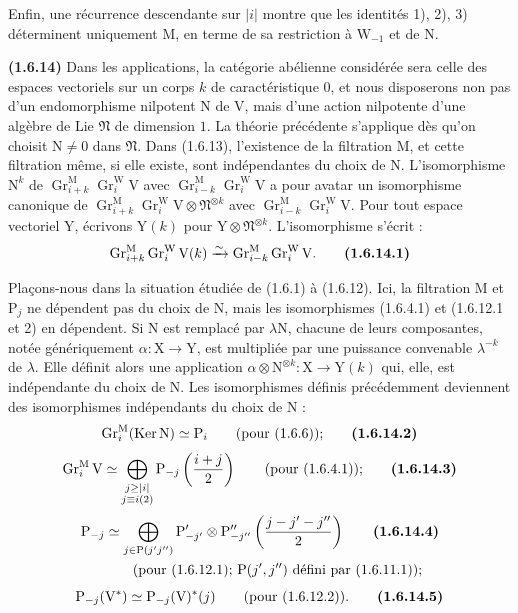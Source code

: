 \documentclass[11pt,leqno]{article}
\newcommand{\Page}[1]{\ifvmode\noindent\else\unskip\ \fi{\footnotesize\textcolor{gray}{[p.\,#1]}}\ \ignorespaces}
\begin{document}
Enfin, une récurrence descendante sur \(|i|\) montre que les identités 1), 2), 3) déterminent uniquement \(\mathrm{M}\), en terme de sa restriction à \(\mathrm{W}_{-1}\) et de \(\mathrm{N}\).

\textbf{(1.6.14)} Dans les applications, la catégorie abélienne considérée sera celle des espaces vectoriels sur un corps \(k\) de caractéristique \(0\), et nous disposerons non pas d’un endomorphisme nilpotent \(\mathrm{N}\) de \(\mathrm{V}\), mais d’une action nilpotente d’une algèbre de Lie \(\mathfrak{N}\) de dimension \(1\). La théorie précédente s’applique dès qu’on choisit \(\mathrm{N}\neq0\) dans \(\mathfrak{N}\). Dans (1.6.13), l’existence de la filtration \(\mathrm{M}\), et cette filtration même, si elle existe, sont indépendantes du choix de \(\mathrm{N}\). L’isomorphisme \(\mathrm{N}^k\) de \(\operatorname{Gr}_{i+k}^{\mathrm{M}}\operatorname{Gr}_i^{\mathrm{W}}\mathrm{V}\) avec \(\operatorname{Gr}_{i-k}^{\mathrm{M}}\operatorname{Gr}_i^{\mathrm{W}}\mathrm{V}\) a pour avatar un isomorphisme canonique de \(\operatorname{Gr}_{i+k}^{\mathrm{M}}\operatorname{Gr}_i^{\mathrm{W}}\mathrm{V}\otimes\mathfrak{N}^{\otimes k}\) avec \(\operatorname{Gr}_{i-k}^{\mathrm{M}}\operatorname{Gr}_i^{\mathrm{W}}\mathrm{V}\). Pour tout espace vectoriel \(\mathrm{Y}\), écrivons \(\mathrm{Y}(k)\) pour \(\mathrm{Y}\otimes\mathfrak{N}^{\otimes k}\). L’isomorphisme s’écrit :
\[
\operatorname{Gr}_{i+k}^{\mathrm{M}}\operatorname{Gr}_i^{\mathrm{W}}\mathrm{V}(k)
\xrightarrow{\sim}
\operatorname{Gr}_{i-k}^{\mathrm{M}}\operatorname{Gr}_i^{\mathrm{W}}\mathrm{V}.
\tag*{\textbf{(1.6.14.1)}}
\]

Plaçons-nous dans la situation étudiée de (1.6.1) à (1.6.12). Ici, la filtration \(\mathrm{M}\) et \(\mathrm{P}_j\) ne dépendent pas du choix de \(\mathrm{N}\), mais les isomorphismes (1.6.4.1) et (1.6.12.1 et 2) en dépendent. Si \(\mathrm{N}\) est remplacé par \(\lambda\mathrm{N}\), chacune de leurs composantes, notée génériquement \(\alpha:\mathrm{X}\to\mathrm{Y}\), est multipliée par une puissance convenable \(\lambda^{-k}\) de \(\lambda\). Elle définit alors une application \(\alpha\otimes\mathrm{N}^{\otimes k}:\mathrm{X}\to\mathrm{Y}(k)\) qui, elle, est indépendante du choix de \(\mathrm{N}\). Les isomorphismes définis précédemment deviennent des isomorphismes indépendants du choix de \(\mathrm{N}\) :
\Page{170}
\[
\operatorname{Gr}_i^{\mathrm{M}}(\operatorname{Ker}\mathrm{N})
\simeq\mathrm{P}_i
\qquad\text{(pour (1.6.6));}
\tag*{\textbf{(1.6.14.2)}}
\]
\[
\operatorname{Gr}_i^{\mathrm{M}}\mathrm{V}
\simeq
\bigoplus_{\substack{j\geq|i|\\j\equiv i(2)}}
\mathrm{P}_{-j}\left(\frac{i+j}{2}\right)
\qquad\text{(pour (1.6.4.1));}
\tag*{\textbf{(1.6.14.3)}}
\]
\begin{align*}
\mathrm{P}_{-j}
&\simeq
\bigoplus_{j\in\mathrm{P}(j'j'')}
\mathrm{P}'_{-j'}\otimes\mathrm{P}''_{-j''}
\left(\frac{j-j'-j''}{2}\right)
\tag*{\textbf{(1.6.14.4)}}\\
&\qquad\text{(pour (1.6.12.1); }\mathrm{P}(j',j'')
\text{ défini par (1.6.11.1));}
\end{align*}
\[
\mathrm{P}_{-j}(\mathrm{V}^*)
\simeq\mathrm{P}_{-j}(\mathrm{V})^*(j)
\qquad\text{(pour (1.6.12.2)).}
\tag*{\textbf{(1.6.14.5)}}
\]
\end{document}

